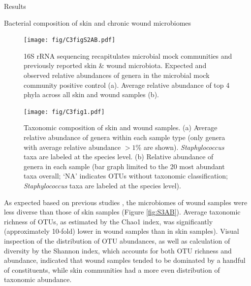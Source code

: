 \documentclass[oneside,12pt,final]{sty/ucthesis-CA2012}
\begin{document}
\begin{mainmatter}
\begin{section}{Results}
\begin{subsection}{Bacterial composition of skin and chronic wound microbiomes}
\begin{figure}
\centerline{\texttt{[image: fig/C3figS2AB.pdf]}}
\caption{16S rRNA sequencing recapitulates microbial mock communities and previously reported skin \& wound microbiota. Expected and observed relative abundances of genera in the microbial mock community positive control (a). Average relative abundance of top 4 phyla across all skin and wound samples (b).}
\label{fig:S2AB}
\end{figure}

\begin{figure}
\centerline{\texttt{[image: fig/C3fig1.pdf]}}
\caption{Taxonomic composition of skin and wound samples. (a) Average relative abundance of genera within each sample type (only genera with average relative abundance $>1$\% are shown). \textit{Staphylococcus} taxa are labeled at the species level. (b) Relative abundance of genera in each sample (bar graph limited to the 20 most abundant taxa overall; ‘NA’ indicates OTUs without taxonomic classification; \textit{Staphylococcus} taxa are labeled at the species level).}
\label{fig:1AB}
\end{figure}
\end{subsection}
 
As expected based on previous studies \cite{RN6}, the microbiomes of wound samples were less diverse than those of skin samples (Figure \ref{fig:S3AB}). Average taxonomic richness of OTUs, as estimated by the Chao1 index, was significantly (approximately 10-fold) lower in wound samples than in skin samples). Visual inspection of the distribution of OTU abundances, as well as calculation of diversity by the Shannon index, which accounts for both OTU richness and abundance, indicated that wound samples tended to be dominated by a handful of constituents, while skin communities had a more even distribution of taxonomic abundance. 


\end{section}
\end{mainmatter}
\end{document}

